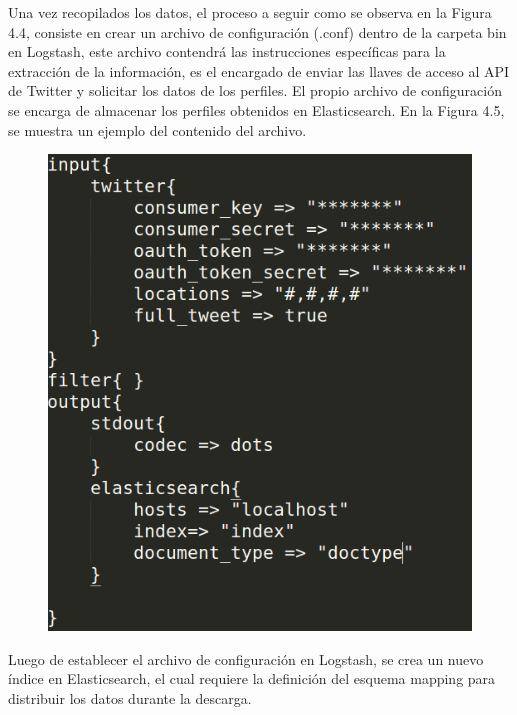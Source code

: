 Una vez recopilados los datos, el proceso a seguir  como se observa en la Figura 4.4, consiste en crear un archivo de configuración (.conf) dentro de la carpeta bin en Logstash, este archivo contendrá las instrucciones específicas para la extracción de la información, es el encargado de enviar las llaves de acceso al API de Twitter y solicitar los datos de los perfiles. El propio archivo de configuración se encarga de almacenar los perfiles obtenidos en Elasticsearch. En la Figura 4.5, se muestra un ejemplo del contenido del archivo.

\begin{figure}[H]
	\centering
	\includegraphics[height=0.25\textheight]{fig01/twitter_conf}
	\label{fig:RHP02}
\end{figure}

Luego de establecer el archivo de configuración en Logstash, se crea un nuevo índice en Elasticsearch, el cual requiere la definición del esquema mapping para distribuir los datos durante la descarga.

